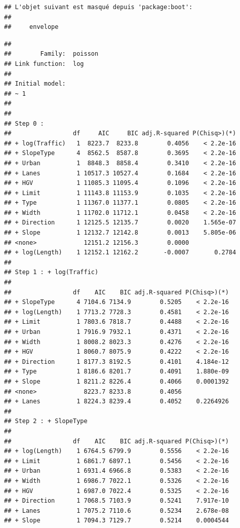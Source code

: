 \documentclass[
]{article}
\begin{document}
\begin{verbatim}
## L'objet suivant est masqué depuis 'package:boot':
## 
##     envelope
\end{verbatim}

\begin{verbatim}
## 
##        Family:  poisson 
## Link function:  log 
## 
## Initial model:
## ~ 1 
## 
## 
## Step 0 :
##                 df     AIC     BIC adj.R-squared P(Chisq>)(*)
## + log(Traffic)   1  8223.7  8233.8        0.4056    < 2.2e-16
## + SlopeType      4  8562.5  8587.8        0.3695    < 2.2e-16
## + Urban          1  8848.3  8858.4        0.3410    < 2.2e-16
## + Lanes          1 10517.3 10527.4        0.1684    < 2.2e-16
## + HGV            1 11085.3 11095.4        0.1096    < 2.2e-16
## + Limit          1 11143.8 11153.9        0.1035    < 2.2e-16
## + Type           1 11367.0 11377.1        0.0805    < 2.2e-16
## + Width          1 11702.0 11712.1        0.0458    < 2.2e-16
## + Direction      1 12125.5 12135.7        0.0020    1.565e-07
## + Slope          1 12132.7 12142.8        0.0013    5.805e-06
## <none>             12151.2 12156.3        0.0000             
## + log(Length)    1 12152.1 12162.2       -0.0007       0.2784
## 
## Step 1 : + log(Traffic) 
## 
##                 df    AIC    BIC adj.R-squared P(Chisq>)(*)
## + SlopeType      4 7104.6 7134.9        0.5205    < 2.2e-16
## + log(Length)    1 7713.2 7728.3        0.4581    < 2.2e-16
## + Limit          1 7803.6 7818.7        0.4488    < 2.2e-16
## + Urban          1 7916.9 7932.1        0.4371    < 2.2e-16
## + Width          1 8008.2 8023.3        0.4276    < 2.2e-16
## + HGV            1 8060.7 8075.9        0.4222    < 2.2e-16
## + Direction      1 8177.3 8192.5        0.4101    4.184e-12
## + Type           1 8186.6 8201.7        0.4091    1.880e-09
## + Slope          1 8211.2 8226.4        0.4066    0.0001392
## <none>             8223.7 8233.8        0.4056             
## + Lanes          1 8224.3 8239.4        0.4052    0.2264926
## 
## Step 2 : + SlopeType 
## 
##                 df    AIC    BIC adj.R-squared P(Chisq>)(*)
## + log(Length)    1 6764.5 6799.9        0.5556    < 2.2e-16
## + Limit          1 6861.7 6897.1        0.5456    < 2.2e-16
## + Urban          1 6931.4 6966.8        0.5383    < 2.2e-16
## + Width          1 6986.7 7022.1        0.5326    < 2.2e-16
## + HGV            1 6987.0 7022.4        0.5325    < 2.2e-16
## + Direction      1 7068.5 7103.9        0.5241    7.917e-10
## + Lanes          1 7075.2 7110.6        0.5234    2.678e-08
## + Slope          1 7094.3 7129.7        0.5214    0.0004544

\end{verbatim}
\end{document}
